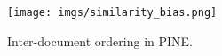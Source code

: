 \begin{figure}[t!]
{
\centering
    \texttt{[image: imgs/similarity\_bias.png]}
    \caption{Inter-document ordering in PINE.}
    \label{fig:similarity_bias}
}
\end{figure}